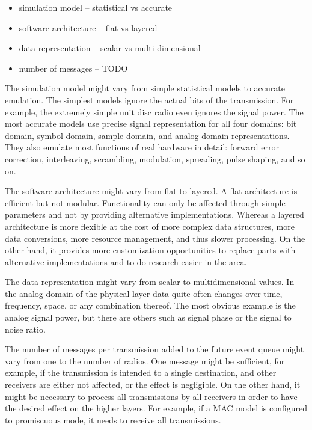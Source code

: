 \begin{itemize}
  \item simulation model -- statistical vs accurate
  \item software architecture -- flat vs layered
  \item data representation -- scalar vs multi-dimensional
  \item number of messages -- TODO 
\end{itemize}

The simulation model might vary from simple statistical models to accurate
emulation. The simplest models ignore the actual bits of the transmission. For
example, the extremely simple unit disc radio even ignores the signal power. The
most accurate models use precise signal representation for all four domains:
bit domain, symbol domain, sample domain, and analog domain representations.
They also emulate most functions of real hardware in detail: forward error
correction, interleaving, scrambling, modulation, spreading, pulse shaping, and
so on.

The software architecture might vary from flat to layered. A flat architecture
is efficient but not modular. Functionality can only be affected through simple
parameters and not by providing alternative implementations. Whereas a layered
architecture is more flexible at the cost of more complex data structures, more
data conversions, more resource management, and thus slower processing. On the
other hand, it provides more customization opportunities to replace parts with
alternative implementations and to do research easier in the area.

The data representation might vary from scalar to multidimensional values. In
the analog domain of the physical layer data quite often changes over time,
frequency, space, or any combination thereof. The most obvious example is the
analog signal power, but there are others such as signal phase or the signal to
noise ratio.

The number of messages per transmission added to the future event queue might
vary from one to the number of radios. One message might be sufficient, for
example, if the transmission is intended to a single destination, and other
receivers are either not affected, or the effect is negligible. On the other
hand, it might be necessary to process all transmissions by all receivers in
order to have the desired effect on the higher layers. For example, if a MAC
model is configured to promiscuous mode, it needs to receive all transmissions.

